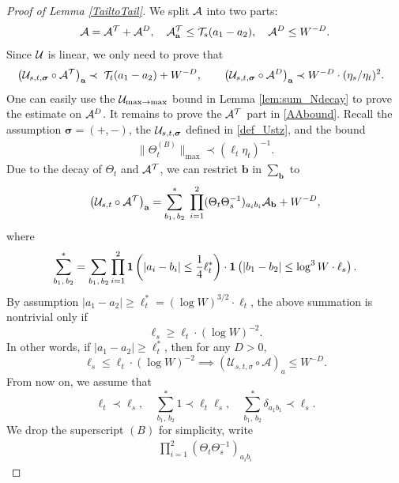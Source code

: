 \documentclass[10pt,reqno]{article}
\theoremstyle{plain} %
\theoremstyle{remark}
\numberwithin{equation}{section}
\begin{document}
 
\begin{proof}[Proof of Lemma \ref{TailtoTail}] We split $\cal A$ into two parts:
$$
{\cal A}={\cal A}^{\cal T} + {\cal A}^{D},\quad {\cal A}^{\cal T}_{\textbf{a}}\le {\cal T}_{s }(a_1-a_2),\quad {\cal A}^{D}\le W^{-D}.
$$ 
Since $\cal U$ is linear, we only need to prove that 
 \begin{align}\label{AAbound}
&\left({\cal U}_{s,t,\boldsymbol{\sigma}} \circ 
{\cal A}^{\cal T}\right)_{\textbf{a}}  \prec
 \; {\cal T}_{t}( a_1-a_2)+W^{-D}, 
\quad 
& &\left({\cal U}_{s,t,\boldsymbol{\sigma}} \circ  
{\cal A}^{D}\right)_{\textbf{a}} \prec 
W^{-D} \cdot(\eta_s/\eta_t)^2.
\end{align}
One can easily use the  $\cal U_{\max\to \max}$ bound in Lemma \ref{lem:sum_Ndecay} to prove
the estimate on ${\cal A}^D$. It remains  to prove the ${\cal A}^{\cal T}$ part in \eqref{AAbound}. 
Recall the assumption $\boldsymbol{\sigma}=(+,-)$, the  ${\cal U}_{s,t,\boldsymbol{\sigma}}$  defined in \ref{def_Ustz},  and the bound 
\begin{align}\label{asfawwws}
  \|\Theta^{(B)}_t\|_{\max}\prec (\ell_t\eta_t)^{-1} . 
\end{align}
 Due to  the decay of  $\Theta_t$ and  ${\cal A}^{\cal T}$, we can restrict $\textbf{b}$ in $\sum_{\textbf{b}}$ to 
\begin{equation}\label{UATSI}
\left({\cal U}_{s, t}\circ {\cal A}^{\cal T}\right)_{\textbf{a}} =\sum_{b_1,\,b_2}^*\;\prod_{i=1}^2 (\Theta_{t  }\Theta^{-1}_{s })_{a_ib_i}
{\cal A}_{\textbf{b}}+W^{-D},
\end{equation}
where 
\begin{align}\label{condbbb}
\sum_{b_1,\,b_2}^*=\sum_{b_1,\,b_2}\prod_{i=1}^2{\bf 1}\left(|a_i-b_i|\le \frac14\ell^*_t\right)\cdot {\bf 1}\left(|b_1-b_2|\le \log^3 W \cdot \ell_s\right).
\end{align}
By assumption $|a_1-a_2|\ge \ell^*_t=(\log W)^{3/2}\cdot  \ell_t$, the above summation is nontrivial only if 
$$
\ell_s\ge \ell_t \cdot (\log  W)^{-2}.
$$
In other words,  if $|a_1-a_2|\ge \ell_t^*$, then for any $D>0$,
$$
\ell_s\le \ell_t \cdot (\log  W)^{-2}\implies \left(\mathcal{U}_{s, t, \sigma} \circ \mathcal{A}\right)_a\le W^{-D}.
$$
From now on, we  assume that %
$$\ell_t\prec \ell_s,\quad\sum_{b_1,\,b_2}^* 1 \prec \ell_t\ell_s, \quad \sum_{b_1,\,b_2}^* \delta_{a_1b_1}\prec \ell_s.
$$ 
We drop the superscript $(B)$ for simplicity, write
\begin{align}\nonumber
  \prod_{i=1}^2  (\Theta_{t  }\Theta^{-1}_{s })_{a_ib_i}

\end{align}
\end{proof}
\end{document}
